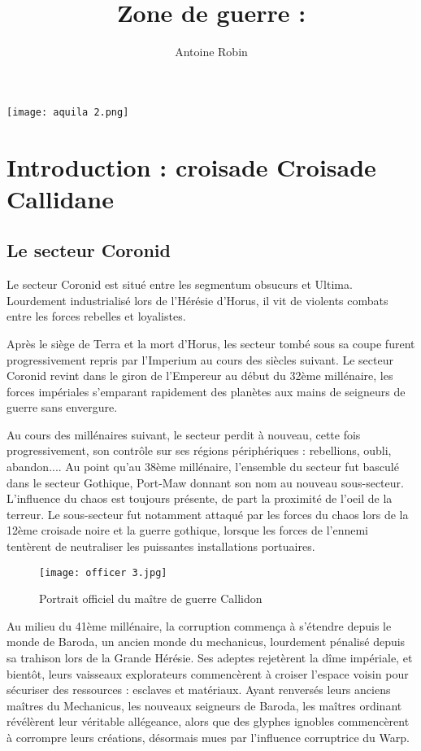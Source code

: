 \documentclass[10pt,a4paper]{book}
\author{ Antoine Robin}
\title{Zone de guerre : \zone}
\newcommand{\croisade}{Croisade Callidane }
\newcommand{\secteur}{secteur Coronid }
\begin{document}
\maketitle
\texttt{[image: aquila 2.png]}
\tableofcontents
\chapter{Introduction : croisade \croisade}
\section{Le \secteur}
Le \secteur est situé entre les segmentum obsucurs et Ultima. Lourdement industrialisé lors de l'Hérésie d'Horus, il vit de violents combats entre les forces rebelles et loyalistes.

Après le siège de Terra et la mort d'Horus, les secteur tombé sous sa coupe furent progressivement repris par l'Imperium au cours des siècles suivant. Le \secteur revint dans le giron de l'Empereur au début du 32ème millénaire, les forces impériales s'emparant rapidement des planètes aux mains de seigneurs de guerre sans envergure.

Au cours des millénaires suivant, le secteur perdit à nouveau, cette fois progressivement, son contrôle sur ses régions périphériques : rebellions, oubli, abandon.... Au point qu'au 38ème millénaire, l'ensemble du secteur fut basculé dans le secteur Gothique, Port-Maw donnant son nom au nouveau sous-secteur. L'influence du chaos est toujours présente, de part la proximité de l'oeil de la terreur. Le sous-secteur fut notamment attaqué par les forces du chaos lors de la 12ème croisade noire et la guerre gothique, lorsque les forces de l'ennemi tentèrent de neutraliser les puissantes installations portuaires.

\begin{wrapfigure}{l}{0.3\textwidth}
  \centering
  \texttt{[image: officer 3.jpg]}
  \caption{Portrait officiel du maître de guerre Callidon}
\end{wrapfigure}

Au milieu du 41ème millénaire, la corruption commença à s'étendre depuis le monde de Baroda, un ancien monde du mechanicus, lourdement pénalisé depuis sa trahison lors de la Grande Hérésie. Ses adeptes rejetèrent la dîme impériale, et bientôt, leurs vaisseaux explorateurs commencèrent à croiser l'espace voisin pour sécuriser des ressources : esclaves et matériaux. Ayant renversés leurs anciens maîtres du Mechanicus, les nouveaux seigneurs de Baroda, les maîtres ordinant révélèrent leur véritable allégeance, alors que des glyphes ignobles commencèrent à corrompre leurs créations, désormais mues par l'influence corruptrice du Warp.
\end{document}
